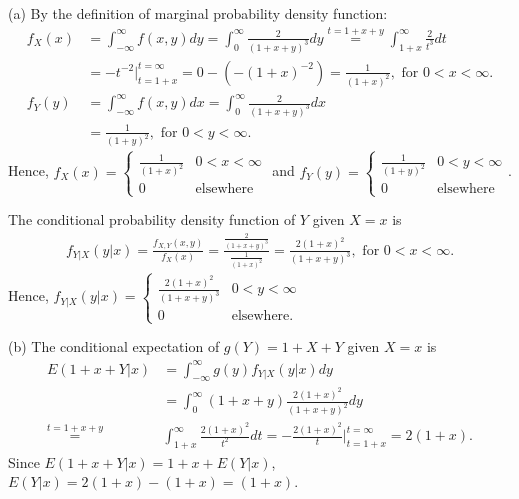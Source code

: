 \begin{solve}
    (a) By the definition of marginal probability density function:
    \begin{align*}
        f_X(x)&= \int_{-\infty}^{\infty}f(x,y)dy=\int_{0}^{\infty} \frac{2}{(1+x+y)^3} dy\stackrel{t=1+x+y}{=}\int_{1+x}^{\infty}\frac{2}{t^3}dt\\
              &= -t^{-2}|_{t=1+x}^{t=\infty} = 0-(-(1+x)^{-2})=\frac{1}{(1+x)^2}, \text{ for } 0<x<\infty.\\
        f_Y(y)&= \int_{-\infty}^{\infty}f(x,y)dx=\int_{0}^{\infty} \frac{2}{(1+x+y)^3} dx\\
              &= \frac{1}{(1+y)^2}, \text{ for } 0<y<\infty.
    \end{align*}
    Hence, $f_X(x)=\left\{\begin{matrix}
       \frac{1}{(1+x)^2} & 0<x<\infty \\
       0 & \text{elsewhere}
       \end{matrix}\right.$
    and $f_Y(y)=\left\{\begin{matrix}
        \frac{1}{(1+y)^2} & 0<y<\infty \\
        0 & \text{elsewhere}
        \end{matrix}\right.$.
    \par
    The conditional probability density function of $Y$ given $X=x$ is 
    \begin{align*}
        f_{Y|X}(y|x)=\frac{f_{X,Y}(x,y)}{f_X(x)}=\frac{\frac{2}{(1+x+y)^3}}{\frac{1}{(1+x)^2}}=\frac{2(1+x)^2}{(1+x+y)^3}, \text{ for } 0<x<\infty.
    \end{align*}
    Hence, $f_{Y|X}(y|x)=\left\{\begin{matrix}
        \frac{2(1+x)^2}{(1+x+y)^3} & 0<y<\infty \\
        0 & \text{elsewhere}.
        \end{matrix}\right.$
    \par
    (b) The conditional expectation of $g(Y)=1+X+Y$ given $X=x$ is
    \begin{align*}
        E(1+x+Y|x) &= \int_{-\infty}^{\infty} g(y) f_{Y|X}(y|x) dy\\
                   &= \int_{0}^{\infty} (1+x+y)\frac{2(1+x)^2}{(1+x+y)^2} dy\\
                   \stackrel{t=1+x+y}{=} &\int_{1+x}^{\infty} \frac{2(1+x)^2}{t^2}dt=-\frac{2(1+x)^2}{t}|_{t=1+x}^{t=\infty}=2(1+x).
    \end{align*}
    Since $E(1+x+Y|x)=1+x+E(Y|x)$, $E(Y|x)=2(1+x)-(1+x)=(1+x)$.
\end{solve}





